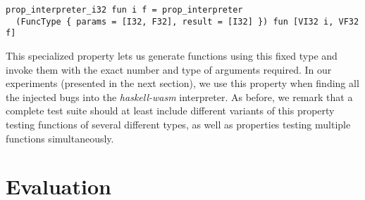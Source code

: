 \documentclass[sigconf, anonymous, review]{acmart}
\newcommand{\mutagen}{\textsc{Mutagen}\xspace}
\begin{document}
\begin{verbatim}
prop_interpreter_i32 fun i f = prop_interpreter
  (FuncType { params = [I32, F32], result = [I32] }) fun [VI32 i, VF32 f]
\end{verbatim}

This specialized property lets us generate functions using this fixed type and
invoke them with the exact number and type of arguments required.
%
In our experiments (presented in the next section), we use this property when
finding all the injected bugs into the \textit{haskell-wasm} interpreter.
%
As before, we remark that a complete test suite should at least include
different variants of this property testing functions of several different
types, as well as properties testing multiple functions simultaneously.




\section{Evaluation}
\label{sec:evaluation}
\end{document}
